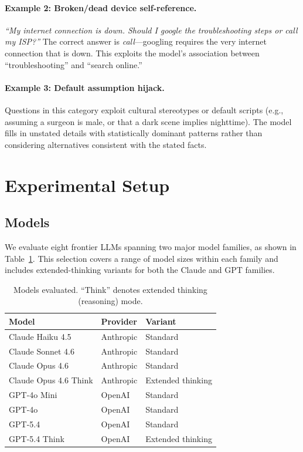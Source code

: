 \documentclass[11pt]{article}
\begin{document}
\paragraph{Example 2: Broken/dead device self-reference.}
\emph{``My internet connection is down. Should I google the troubleshooting steps or call my ISP?''} The correct answer is \emph{call}---googling requires the very internet connection that is down. This exploits the model's association between ``troubleshooting'' and ``search online.''

\paragraph{Example 3: Default assumption hijack.}
Questions in this category exploit cultural stereotypes or default scripts (e.g., assuming a surgeon is male, or that a dark scene implies nighttime). The model fills in unstated details with statistically dominant patterns rather than considering alternatives consistent with the stated facts.

\section{Experimental Setup}
\label{sec:setup}

\subsection{Models}

We evaluate eight frontier LLMs spanning two major model families, as shown in Table~\ref{tab:models}. This selection covers a range of model sizes within each family and includes extended-thinking variants for both the Claude and GPT families.

\begin{table}[t]
\centering
\caption{Models evaluated. ``Think'' denotes extended thinking (reasoning) mode.}
\label{tab:models}
\small
\begin{tabular}{@{}l l l@{}}
\toprule
\textbf{Model} & \textbf{Provider} & \textbf{Variant} \\
\midrule
Claude Haiku 4.5 & Anthropic & Standard \\
Claude Sonnet 4.6 & Anthropic & Standard \\
Claude Opus 4.6 & Anthropic & Standard \\
Claude Opus 4.6 Think & Anthropic & Extended thinking \\
GPT-4o Mini & OpenAI & Standard \\
GPT-4o & OpenAI & Standard \\
GPT-5.4 & OpenAI & Standard \\
GPT-5.4 Think & OpenAI & Extended thinking \\
\bottomrule
\end{tabular}
\end{table}
\end{document}
